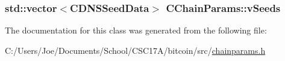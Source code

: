 \subsubsection[{v\+Seeds}]{\setlength{\rightskip}{0pt plus 5cm}std\+::vector$<${\bf C\+D\+N\+S\+Seed\+Data}$>$ C\+Chain\+Params\+::v\+Seeds\hspace{0.3cm}{\ttfamily [protected]}}\label{class_c_chain_params_a9ce50b4162fb2ebf5bd72ad4045aa70c}


The documentation for this class was generated from the following file\+:\begin{DoxyCompactItemize}
\item 
C\+:/\+Users/\+Joe/\+Documents/\+School/\+C\+S\+C17\+A/bitcoin/src/\hyperlink{chainparams_8h}{chainparams.\+h}\end{DoxyCompactItemize}
